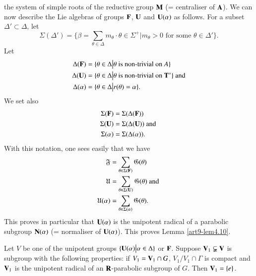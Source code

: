 the system  of simple roots of the reductive group $\mathbf{M}$ (= centraliser of $\mathbf{A}$). We can now describe the Lie algebras of groups $\mathbf{F}$, $\mathbf{U}$ and $\mathbf{U} (\alpha)$ as follows. For a subset $\Delta' \subset \Delta$, let
$$
\Sigma (\Delta') = \{\beta = \sum\limits_{\theta \in \Delta} m_\theta  \cdot \theta \in \Sigma^+ \big| m_\theta > 0 \text{ for some } \theta \in \Delta'\}.
$$
Let 
\begin{align*}
\Delta (\mathbf{F}) & = \{\theta \in \Delta \big| \theta \text{ is non-trivial on } A \}\\
\Delta (\mathbf{U}) & = \{\theta \in \Delta \big| \theta \text{ is non-trivial on } \mathbf{T}^\ast\} \text{ and} \\
\Delta (\alpha) & = \{\theta \in \Delta \big| r (\theta) = \alpha \}.
\end{align*}
We set also 
\begin{align*}
\Sigma(\mathbf{F}) & = \Sigma (\Delta (\mathbf{F}))\\
\Sigma (\mathbf{U}) & = \Sigma (\Delta (\mathbf{U})) \text{ and }\\
\Sigma (\alpha) & = \Sigma (\Delta (\alpha)).
\end{align*}
With this notation, one sees easily that we have
\begin{align*}
\mathfrak{F} & = \sum\limits_{\theta \in \Sigma (\mathbf{F})} \mathfrak{G} (\theta) \\
\mathfrak{U} & = \sum\limits_{\theta \in \Sigma (\mathbf{U})} \mathfrak{G} (\theta) \text{ and }\\
\mathfrak{U}(\alpha) & =  \sum\limits_{\theta \in \Sigma (\alpha)} \mathfrak{G} (\theta).
\end{align*}
This proves in particular that $\mathbf{U}(\alpha)$ is the unipotent radical of a parabolic subgroup $\mathbf{N} (\alpha)$ (= normaliser of $\mathbf{U} (\alpha)$). This proves Lemma \ref{art9-lem4.10}.

\setcounter{definition}{11}
\begin{lemma}\label{art9-lem4.12}
Let $V$ be one of the unipotent groups $\{\mathbf{U} (\alpha) \big| \alpha \in \Delta\}$ or $\mathbf{F}$. Suppose $\mathbf{V}_1 \varsubsetneqq \mathbf{V}$ is subgroup with the following properties: if $V_1 =\mathbf{V}_1 \cap G$, $V_1 / V_1 \cap \Gamma$ is compact and  $\mathbf{V}_1$ is the unipotent radical of an $\mathbf{R}$-parabolic subgroup of $G$. Then $\mathbf{V}_1 = \{e\}$.
\end{lemma}

\setcounter{subsection}{12}
